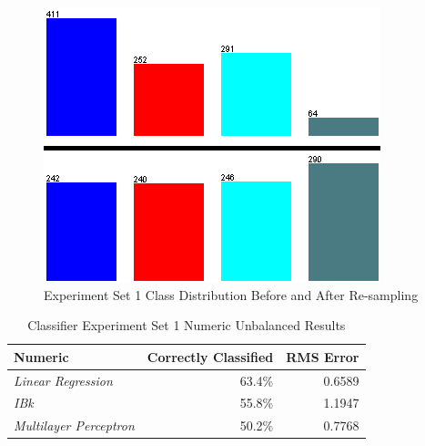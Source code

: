 \documentclass[../thesis/thesis.tex]{subfiles}
\begin{document}
\begin{figure}
\centering
\includegraphics{../diagrams/temp/resample.png}
\caption{Experiment Set 1 Class Distribution Before and After Re-sampling}
\label{fig:results:resample}
\end{figure}

\begin{table}
\centering
\begin{tabular}{|l|r|r|}
\hline
\textbf{Numeric}               & \textbf{Correctly Classified} & \textbf{RMS Error} \\ \hline
\textit{Linear Regression}     & 63.4\%                        & 0.6589             \\ \hline
\textit{IBk}                   & 55.8\%                        & 1.1947             \\ \hline
\textit{Multilayer Perceptron} & 50.2\%                        & 0.7768             \\ \hline
\end{tabular}
\caption{Classifier Experiment Set 1 Numeric Unbalanced Results}
\end{table}

\end{document}
